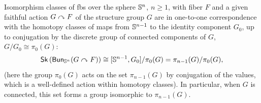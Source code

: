 \begin{cor}
     Isomorphism classes of \glspl{fb} over the sphere $\mathbb{S}^n$, $n\geq 1$, with fiber $F$ and a given faithful action $G\curvearrowright F$ of the structure group $G$ are in one-to-one correspondence with the homotopy classes of maps from $\mathbb{S}^{n-1}$ to the identity component $G_0$, up to conjugation by the discrete group of connected components of $G$, $G\slash G_0\cong \pi_0(G)$:
    \[
    \mathsf{Sk}\left(\mathsf{Bun}_{\mathbb{S}^n}(G\curvearrowright F)\right)\cong [\mathbb{S}^{n-1},G_0]/\pi_0(G)= \pi_{n-1}(G)/\pi_0(G),\label{FB(G) and homotopy(G)}
    \]
    (here the group $\pi_0(G)$ acts on the set $\pi_{n-1}(G)$ by conjugation of the values, which is a well-defined action within homotopy classes). In particular, when $G$ is connected, this set forms a group isomorphic to $\pi_{n-1}(G)$.
\end{cor}
